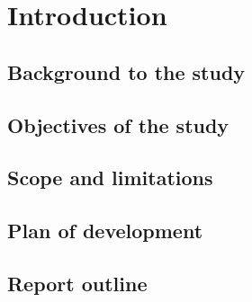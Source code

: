 \section{Introduction}
\subsection{Background to the study}

\subsection{Objectives of the study}

\subsection{Scope and limitations}

\subsection{Plan of development}

\subsection{Report outline}
